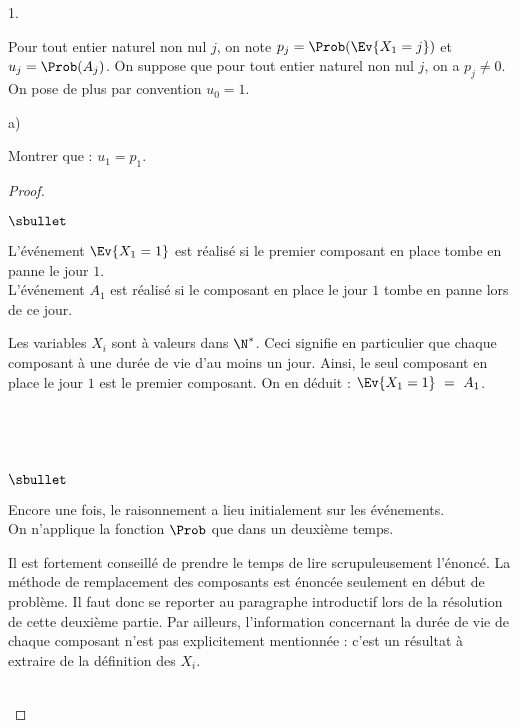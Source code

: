 \documentclass[11pt]{article}%
\begin{document}
\begin{noliste}{1.}
  \setlength{\itemsep}{2mm} \setcounter{enumi}{3}
\item Pour tout entier naturel non nul $j$, on note
  $p_j=\Prob(\Ev{X_1=j})$ et $u_j=\Prob(A_j)$. On suppose que pour
  tout entier naturel non nul $j$, on a $p_j \neq 0$. On pose de plus
  par convention $u_0=1$.
  \begin{noliste}{a)}
  \item Montrer que : $u_1 = p_1$.\\[-.8cm]

    \begin{proof}~%
      \begin{noliste}{$\sbullet$}
      \item L'événement $\Ev{X_1 = 1}$ est réalisé si le premier
        composant en place tombe en panne le jour $1$.\\
        L'événement $A_1$ est réalisé si le composant en place le jour
        $1$ tombe en panne lors de ce jour.

      \item Les variables $X_i$ sont à valeurs dans $\N^*$. Ceci
        signifie en particulier que chaque composant à une durée de
        vie d'au moins un jour. Ainsi, le seul composant en place le
        jour $1$ est le premier composant. On en déduit : $\Ev{X_1 =
          1} \ = \ A_1$.
      \end{noliste}
      ~\\[-1.4cm]
      \begin{remarkL}{.95}~\\[-.8cm]%
        \begin{noliste}{$\sbullet$}
        \item Encore une fois, le raisonnement a lieu initialement sur
          les événements.\\
          On n'applique la fonction $\Prob$ que dans un deuxième
          temps.
        \item Il est fortement conseillé de prendre le temps de lire
          scrupuleusement l'énoncé. La méthode de remplacement des
          composants est énoncée seulement en début de problème. Il
          faut donc se reporter au paragraphe introductif lors de la
          résolution de cette deuxième partie. Par ailleurs,
          l'information concernant la durée de vie de chaque composant
          n'est pas explicitement mentionnée : c'est un résultat à
          extraire de la définition des \var $X_i$.
        \end{noliste}
      \end{remarkL}~\\[-1.4cm]
    \end{proof}
    


\end{noliste}
\end{noliste}
\end{document}

